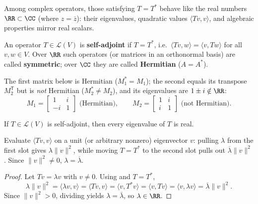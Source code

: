 \documentclass[10pt]{scrartcl}
\newcommand{\LL}{\mathcal L}\newcommand{\PP}{\mathcal P}\newcommand{\MM}{\mathcal M}
\begin{document}
Among complex operators, those satisfying $T=T^*$ behave like the real numbers $\RR\subset\CC$ (where $z=\overline{z}$): their eigenvalues, quadratic values $\langle Tv,v\rangle$, and algebraic properties mirror real scalars.

\begin{definition*}
  An operator $T\in\LL(V)$ is \textbf{self-adjoint} if $T=T^*$, i.e.\ $\langle Tv,w\rangle=\langle v,Tw\rangle$ for all $v,w\in V$. Over $\RR$ such operators (or matrices in an orthonormal basis) are called \textbf{symmetric}; over $\CC$ they are called \textbf{Hermitian} ($A=A^*$).
\end{definition*}

\begin{example*}
  The first matrix below is Hermitian ($M_1^*=M_1$); the second equals its transpose $M_2^{\mathsf T}$ but is \emph{not} Hermitian ($M_2^*\neq M_2$), and its eigenvalues are $1\pm i\notin\RR$:
  \[
    M_1 = \begin{bmatrix}1&i\\-i&1\end{bmatrix} \text{ (Hermitian)}, \qquad
    M_2 = \begin{bmatrix}1&i\\i&1\end{bmatrix} \text{ (not Hermitian)}.
  \]
\end{example*}

\begin{theorem*}
  If $T\in\LL(V)$ is self-adjoint, then every eigenvalue of $T$ is real.
\end{theorem*}
\begin{ideabox}
  Evaluate $\langle Tv,v\rangle$ on a unit (or arbitrary nonzero) eigenvector $v$: pulling $\lambda$ from the first slot gives $\lambda\|v\|^2$, while moving $T=T^*$ to the second slot pulls out $\overline{\lambda}\|v\|^2$. Since $\|v\|^2\neq0$, $\lambda=\overline{\lambda}$.
\end{ideabox}
\begin{proof}
  Let $Tv=\lambda v$ with $v\neq0$. Using  and $T=T^*$,
  \[
    \lambda\|v\|^2 = \langle \lambda v,v\rangle = \langle Tv,v\rangle = \langle v,T^*v\rangle = \langle v,Tv\rangle = \langle v,\lambda v\rangle = \overline{\lambda}\|v\|^2.
  \]
  Since $\|v\|^2>0$, dividing yields $\lambda=\overline{\lambda}$, so $\lambda\in\RR$.
\end{proof}
\end{document}
